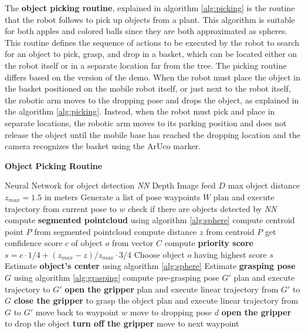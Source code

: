The \textbf{object picking routine}, explained in algorithm \ref{alg:picking} is the routine that the robot follows
to pick up objects from a plant. This algorithm is suitable for both apples and colored balls since they are
both approximated as spheres. This routine defines the sequence of actions to be executed by the robot
to search for an object to pick, grasp, and drop in a basket, which can be located either on the robot itself
or in a separate location far from the tree.
The picking routine differs based on the version of the demo. When the robot must place the object
in the basket positioned on the mobile robot itself, or just next to the robot itself, the robotic arm moves to
the dropping pose and drops the object, as explained in the algorithm \ref{alg:picking}. Instead, when the robot
must pick and place in separate locations, the robotic arm moves to its parking position and does not release the object
until the mobile base has reached the dropping location and the camera recognizes the basket using the ArUco marker.

\begin{algorithm}[H]
    \caption{\textbf{Object Picking Routine}}
    \label{alg:picking}
    \begin{algorithmic}[1]
        \Require Neural Network for object detection \textit{NN}
        \Require Depth Image feed $D$
        \State max object distance $z_{max} = 1.5$ in meters
        \State Generate a list of pose waypoints $W$
            \State plan and execute trajectory from current pose to $w$
            \State check if there are objects detected by \textit{NN}
                \State compute \textbf{segmented pointcloud} using algorithm \ref{alg:sphere}
                \State compute centroid point $P$ from segmented pointcloud
                \State compute distance $z$ from centroid $P$
                \State get confidence score $c$ of object $o$ from vector $C$
                \State compute \textbf{priority score} $s = c \cdot 1/4 + (z_{max} - z)/z_{max} \cdot 3/4$
            \EndFor
            \State Choose object $o$ having highest score $s$
        \EndFor
        \State Estimate \textbf{object's center} using algorithm \ref{alg:sphere}
        \State Estimate \textbf{grasping pose} $G$ using algorithm \ref{alg:grasping}
            \State compute pre-grasping pose $G'$
            \State plan and execute trajectory to $G'$
            \State \textbf{open the gripper}
            \State plan and execute linear trajectory from $G'$ to $G$
            \State \textbf{close the gripper} to grasp the object
            \State plan and execute linear trajectory from $G$ to $G'$
            \State move back to waypoint $w$
            \State move to dropping pose $d$
            \State \textbf{open the gripper} to drop the object
            \State \textbf{turn off the gripper}
        \Else
            \State move to next waypoint
        \EndIf
    \end{algorithmic}
\end{algorithm}

